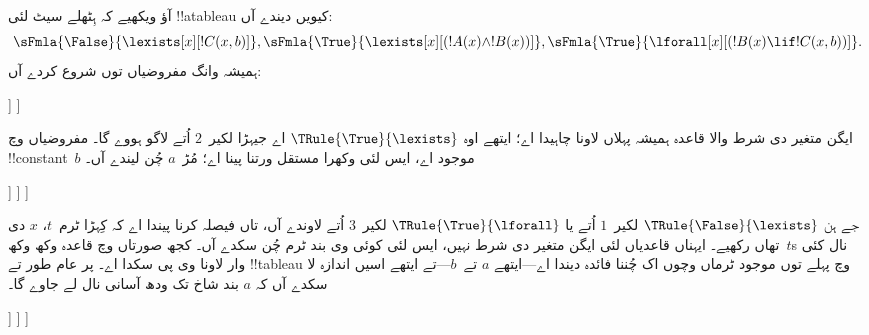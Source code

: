 \documentclass[../../../include/open-logic-section]{subfiles}
\begin{document}
\begin{ex}
آؤ ویکھیے کہ ہِٹھلے سیٹ لئی !!a{tableau} کیویں دیندے آں:
\[
\sFmla{\False}{\lexists[x][!C(x,b)]},
\sFmla{\True}{\lexists[x][(!A(x) \land !B(x))]},
\sFmla{\True}{\lforall[x][(!B(x) \lif !C(x,b))]}.
\]
ہمیشہ وانگ مفروضیاں توں شروع کردے آں:
\begin{oltableau}
  [\sFmla{\False}{\lexists[x][\formula{C}(x,b)]}, just=\TAss
    [\sFmla{\True}{\lexists[x][(\formula{A}(x) \land \formula{B}(x))]},
      just=\TAss
      [\sFmla{\True}{\lforall[x][(\formula{B}(x) \lif \formula{C}(x,b))]},
        just=\TAss]
    ]
  ]
\end{oltableau}
ایگن متغیر دی شرط والا قاعدہ ہمیشہ پہلاں لاونا چاہیدا اے؛
ایتھے اوہ $\TRule{\True}{\lexists}$ اے جیہڑا
لکیر~$2$ اُتے لاگو ہووے گا۔ مفروضیاں وچ !!{constant}~$b$
موجود اے، ایس لئی وکھرا مستقل ورتنا پینا اے؛ مُڑ~$a$ چُن لیندے آں۔
\begin{oltableau}
  [\sFmla{\False}{\lexists[x][\formula{C}(x,b)]}, just=\TAss
    [\sFmla{\True}{\lexists[x][(\formula{A}(x) \land \formula{B}(x))]},
      just=\TAss, checked
      [\sFmla{\True}{\lforall[x][(\formula{B}(x) \lif \formula{C}(x,b))]},
        just=\TAss
        [\sFmla{\True}{\formula{A}(a) \land \formula{B}(a)},
          just={\TRule{\True}{\lexists}[2]}]
      ]
    ]
  ]
\end{oltableau}
جے ہن $\TRule{\False}{\lexists}$ لکیر~$1$ اُتے یا
$\TRule{\True}{\lforall}$ لکیر~$3$ اُتے لاوندے آں، تاں
فیصلہ کرنا پیندا اے کہ کِہڑا ٹرم~$t$، $x$ دی تھاں رکھیے۔
ایہناں قاعدیاں لئی ایگن متغیر دی شرط نہیں، ایس لئی کوئی وی
بند ٹرم چُن سکدے آں۔ کجھ صورتاں وچ قاعدہ وکھ وکھ~$t$s نال
کئی وار لاونا وی پی سکدا اے۔ پر عام طور تے !!{tableau} وچ
پہلے توں موجود ٹرماں وچوں اک چُننا فائدہ دیندا اے---ایتھے
$a$ تے~$b$---تے ایتھے اسیں اندازہ لا سکدے آں کہ $a$
بند شاخ تک ودھ آسانی نال لے جاوے گا۔
\begin{oltableau}
  [\sFmla{\False}{\lexists[x][\formula{C}(x,b)]}, just=\TAss
    [\sFmla{\True}{\lexists[x][(\formula{A}(x) \land \formula{B}(x))]},
      just=\TAss, checked
      [\sFmla{\True}{\lforall[x][(\formula{B}(x) \lif \formula{C}(x,b))]}, just=\TAss
        [\sFmla{\True}{\formula{A}(a) \land \formula{B}(a)}, just={\TRule{\True}{\lexists}[2]}
          [\sFmla{\False}{\formula{C}(a,b)}, just={\TRule{\False}{\lexists}[1]}
            [\sFmla{\True}{\formula{B}(a) \lif \formula{C}(a,b)},
              just={\TRule{\True}{\lforall}[3]}
            ]
          ]
        ]
      ]

\end{oltableau}
\end{ex}
\end{document}
